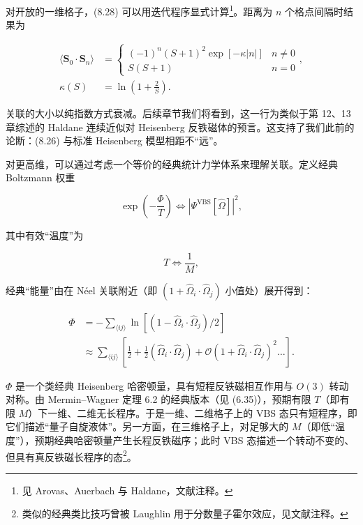对开放的一维格子，(8.28) 可以用迭代程序显式计算\footnote{见 Arovas、Auerbach 与 Haldane，文献注释。}。距离为 $n$ 个格点间隔时结果为

\begin{align*}
\langle \mathbf {S} _ {0} \cdot \mathbf {S} _ {n} \rangle & = \left\{ \begin{array}{ll} ( - 1 ) ^ {n} ( S + 1 ) ^ {2} \exp [ - \kappa | n | ] & n \neq 0 \\ S ( S + 1 ) & n = 0 \end{array} \right. ,\\
\kappa ( S ) & = \ln \left( 1 + \frac {2}{S} \right) .
\tag{8.30}
\end{align*}

关联的大小以纯指数方式衰减。后续章节我们将看到，这一行为类似于第 12、13 章综述的 Haldane 连续近似对 Heisenberg 反铁磁体的预言。这支持了我们此前的论断：(8.26) 与标准 Heisenberg 模型相距不“远”。

对更高维，可以通过考虑一个等价的经典统计力学体系来理解关联。定义经典 Boltzmann 权重

\begin{equation*}
\exp \left( - \frac {\Phi}{T} \right) \Leftrightarrow \left| \Psi^ {\mathrm{VBS}} [ \hat {\Omega} ] \right| ^ {2} ,
\tag{8.31}
\end{equation*}

其中有效“温度”为

\begin{equation*}
T \Leftrightarrow \frac {1}{M} ,
\tag{8.32}
\end{equation*}

经典“能量”由在 Néel 关联附近（即 $(1 + \hat{\Omega}_{i} \cdot \hat{\Omega}_{j})$ 小值处）展开得到：

\begin{align*}
\Phi & = - \sum_{\langle ij \rangle} \ln \left[ ( 1 - \hat {\Omega} _ {i} \cdot \hat {\Omega} _ {j} ) / 2 \right]\\
& \approx \sum_{\langle ij \rangle} \left[ \frac {1}{2} + \frac {1}{2} \left( \hat {\Omega} _ {i} \cdot \hat {\Omega} _ {j} \right) + \mathcal {O} \left( 1 + \hat {\Omega} _ {i} \cdot \hat {\Omega} _ {j} \right) ^ {2} \dots \right] .
\tag{8.33}
\end{align*}

$\Phi$ 是一个类经典 Heisenberg 哈密顿量，具有短程反铁磁相互作用与 $O(3)$ 转动对称。由 Mermin--Wagner 定理 6.2 的经典版本（见 (6.35)），预期有限 $T$（即有限 $M$）下一维、二维无长程序。于是一维、二维格子上的 VBS 态只有短程序，即它们描述“量子自旋液体”。另一方面，在三维格子上，对足够大的 $M$（即低“温度”），预期经典哈密顿量产生长程反铁磁序；此时 VBS 态描述一个转动不变的、但具有真反铁磁长程序的态\footnote{类似的经典类比技巧曾被 Laughlin 用于分数量子霍尔效应，见文献注释。}。

